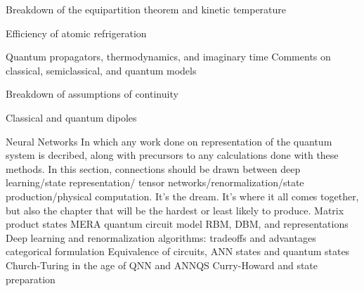 { Breakdown of the equipartition theorem and kinetic temperature
{ Efficiency of atomic refrigeration
{ Quantum propagators, thermodynamics, and imaginary time
 Comments on classical, semiclassical, and quantum models
{ Breakdown of assumptions of continuity
{ Classical and quantum dipoles
{
Neural Networks In which any work done on representation of the quantum system is
decribed, along with precursors to any calculations done with these methods. In
this section, connections should be drawn between deep learning/state representation/
tensor networks/renormalization/state production/physical computation. It's
the dream. It's where it all comes together, but also the chapter that will be the
hardest or least likely to produce.
 Matrix product states
 MERA
 quantum circuit model
 RBM, DBM, and representations
 Deep learning and renormalization
 algorithms: tradeoffs and advantages
 categorical formulation
 Equivalence of circuits, ANN states and quantum states
 Church-Turing in the age of QNN and ANNQS
 Curry-Howard and state preparation

}}}}}}
